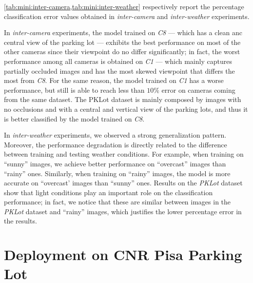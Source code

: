 \ref{tab:mini:inter-camera,tab:mini:inter-weather} respectively report the percentage classification error values obtained in \emph{inter-camera} and \emph{inter-weather} experiments.

In \emph{inter-camera} experiments, the model trained on \emph{C8} --- which has a clean anc central view of the parking lot --- exhibits the best performance on most of the other cameras since their viewpoint do no differ significantly;
in fact, the worst performance among all cameras is obtained on \emph{C1} --- which mainly captures partially occluded images and has the most skewed viewpoint that differs the most from \emph{C8}.
For the same reason, the model trained on \emph{C1} has a worse performance, but still is able to reach less than $10\%$ error on cameras coming from the same dataset.
The PKLot dataset is mainly composed by images with no occlusions and with a central and vertical view of the parking lots, and thus it is better classified by the model trained on \emph{C8}.

In \emph{inter-weather} experiments, we observed a strong generalization pattern.
Moreover, the performance degradation is directly related to the difference between training and testing weather conditions.
For example, when training on ``sunny'' images, we achieve better performance on ``overcast'' images than ``rainy'' ones.
Similarly, when training on ``rainy'' images, the model is more accurate on ``overcast' images than ``sunny'' ones.
Results on the \emph{PKLot} dataset show that light conditions play an important role on the classification performance;
in fact, we notice that these are similar between images in the \emph{PKLot} dataset and ``rainy'' images, which justifies the lower percentage error in the results.

\section{Deployment on CNR Pisa Parking Lot}
\label{sec:mini:deployment}

